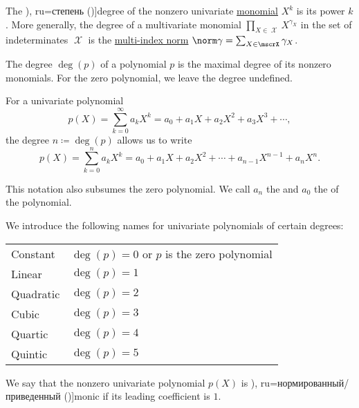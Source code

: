 \begin{definition}\label{def:polynomial_degree}
  The \term[bg=степен (\cite[page 1 in \textparagraph 8]{НеновБожилов2007}), ru=степень (\cite[sec. 11.3]{Тыртышников2007})]{degree} of the nonzero univariate \hyperref[def:polynomial_algebra]{monomial} \( X^k \) is its power \( k \). More generally, the degree of a multivariate monomial \( \prod_{X \in \mscrX} X^{\gamma_X} \) in the set of indeterminates \( \mscrX \) is the \hyperref[def:multi_index]{multi-index norm} \( \norm \gamma = \sum_{X \in \mscrX} \gamma_X \).

  The degree \( \deg(p) \) of a polynomial \( p \) is the maximal degree of its nonzero monomials. For the zero polynomial, we leave the degree undefined.

  For a univariate polynomial
  \begin{equation*}
    p(X) = \sum_{k=0}^\infty a_k X^k = a_0 + a_1 X + a_2 X^2 + a_3 X^3 + \cdots,
  \end{equation*}
  the degree \( n \coloneqq \deg(p) \) allows us to write
  \begin{equation*}
    p(X) = \sum_{k=0}^n a_k X^k = a_0 + a_1 X + a_2 X^2 + \cdots + a_{n-1} X^{n-1} + a_n X^n.
  \end{equation*}

  This notation also subsumes the zero polynomial. We call \( a_n \) the  and \( a_0 \) the  of the polynomial.

  We introduce the following names for univariate polynomials of certain degrees:
  \begin{center}
    \begin{tabular}{l | l}
      Constant  & \( \deg(p) = 0 \) or \( p \) is the zero polynomial \\
      Linear    & \( \deg(p) = 1 \)                                   \\
      Quadratic & \( \deg(p) = 2 \)                                   \\
      Cubic     & \( \deg(p) = 3 \)                                   \\
      Quartic   & \( \deg(p) = 4 \)                                   \\
      Quintic   & \( \deg(p) = 5 \)
    \end{tabular}
  \end{center}
\end{definition}

\begin{definition}\label{def:monic_polynomial}
  We say that the nonzero univariate polynomial \( p(X) \) is \term[bg=унитарен (\cite[page 1 in \textparagraph 14]{НеновБожилов2007}), ru=нормированный/приведенный (\cite[102]{Винберг2014})]{monic} if its leading coefficient is \( 1 \).
\end{definition}

